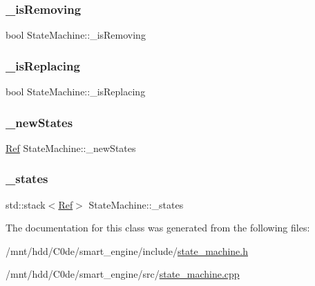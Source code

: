 \subsubsection{\texorpdfstring{\+\_\+is\+Removing}{\_isRemoving}}
{\footnotesize\ttfamily bool State\+Machine\+::\+\_\+is\+Removing\hspace{0.3cm}{\ttfamily [private]}}

\mbox{\label{classStateMachine_abb01bcc9617e9978db7afc34e03ba8d8}} 
\subsubsection{\texorpdfstring{\+\_\+is\+Replacing}{\_isReplacing}}
{\footnotesize\ttfamily bool State\+Machine\+::\+\_\+is\+Replacing\hspace{0.3cm}{\ttfamily [private]}}

\mbox{\label{classStateMachine_a6be0d507a29fbee40d335d7a47a9122f}} 
\subsubsection{\texorpdfstring{\+\_\+new\+States}{\_newStates}}
{\footnotesize\ttfamily \hyperlink{state__machine_8h_a6052c67656ab2e47e32df9051a84e8f4}{Ref} State\+Machine\+::\+\_\+new\+States\hspace{0.3cm}{\ttfamily [private]}}

\mbox{\label{classStateMachine_a30a1846aa7b38b026b01c6075c475946}} 
\subsubsection{\texorpdfstring{\+\_\+states}{\_states}}
{\footnotesize\ttfamily std\+::stack$<$\hyperlink{state__machine_8h_a6052c67656ab2e47e32df9051a84e8f4}{Ref}$>$ State\+Machine\+::\+\_\+states\hspace{0.3cm}{\ttfamily [private]}}



The documentation for this class was generated from the following files\+:\begin{DoxyCompactItemize}
\item 
/mnt/hdd/\+C0de/smart\+\_\+engine/include/\hyperlink{state__machine_8h}{state\+\_\+machine.\+h}\item 
/mnt/hdd/\+C0de/smart\+\_\+engine/src/\hyperlink{state__machine_8cpp}{state\+\_\+machine.\+cpp}\end{DoxyCompactItemize}
